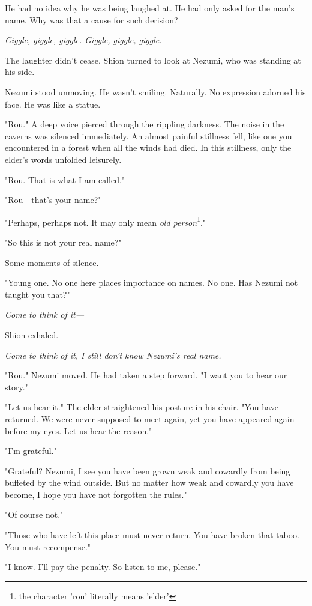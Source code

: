 He had no idea why he was being laughed at. He had only asked for the
man's name. Why was that a cause for such derision?

\emph{Giggle, giggle, giggle. Giggle, giggle, giggle.}

The laughter didn't cease. Shion turned to look at Nezumi, who was
standing at his side.

Nezumi stood unmoving. He wasn't smiling. Naturally. No expression
adorned his face. He was like a statue.

"Rou." A deep voice pierced through the rippling darkness. The noise in
the caverns was silenced immediately. An almost painful stillness fell,
like one you encountered in a forest when all the winds had died. In
this stillness, only the elder's words unfolded leisurely.

"Rou. That is what I am called."

"Rou---that's your name?"

"Perhaps, perhaps not. It may only mean \emph{old person}\footnote{the character 'rou'  literally means 'elder'}."

"So this is not your real name?"

Some moments of silence.

"Young one. No one here places importance on names. No one. Has Nezumi
not taught you that?"

\emph{Come to think of it---}

Shion exhaled.

\emph{Come to think of it, I still don't know Nezumi's real name.}

"Rou." Nezumi moved. He had taken a step forward. "I want you to hear
our story."

"Let us hear it." The elder straightened his posture in his chair. "You
have returned. We were never supposed to meet again, yet you have
appeared again before my eyes. Let us hear the reason."

"I'm grateful."

"Grateful? Nezumi, I see you have been grown weak and cowardly from
being buffeted by the wind outside. But no matter how weak and cowardly
you have become, I hope you have not forgotten the rules."

"Of course not."

"Those who have left this place must never return. You have broken that
taboo. You must recompense."

"I know. I'll pay the penalty. So listen to me, please."

